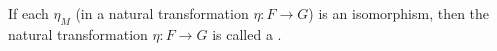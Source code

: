If each $\eta_M$ (in a natural transformation $\eta: F \to G$) is an isomorphism, then the natural transformation $\eta: F \to G$ is called a .
